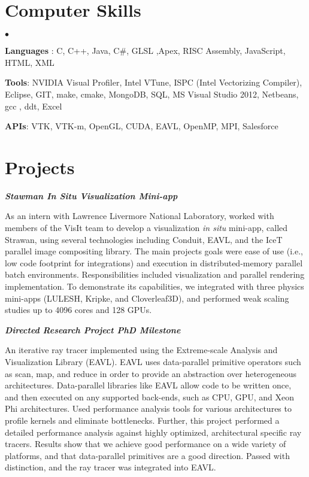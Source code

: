 \documentclass[margin,line]{res}
\newenvironment{list2}{
  \begin{list}{$\bullet$}{%
      \setlength{\itemsep}{0in}
      \setlength{\parsep}{0in} \setlength{\parskip}{0in}
      \setlength{\topsep}{0in} \setlength{\partopsep}{0in} 
      \setlength{\leftmargin}{0.2in}}}{\end{list}}
\begin{document}
\begin{resume}
\section{\sc Computer Skills} 
\begin{list2}
	\item \textbf{Languages} :  C, C++, Java, C\#, GLSL ,Apex, RISC Assembly, JavaScript, HTML, XML
	\item \textbf{Tools}:  NVIDIA Visual Profiler, Intel VTune, ISPC (Intel Vectorizing Compiler), Eclipse, GIT, make, cmake, MongoDB, SQL, MS Visual Studio 2012, Netbeans, gcc , ddt, Excel 
	\item \textbf{APIs}: VTK, VTK-m, OpenGL, CUDA, EAVL, OpenMP, MPI, Salesforce
\end{list2}

\section{\sc Projects}
{\em \textbf{Stawman In Situ Visualization Mini-app} }

\vspace{-.4cm}
As an intern with Lawrence Livermore National Laboratory, worked with members of the VisIt team to develop a visualization \textit{in situ} mini-app, called Strawan, using several technologies including Conduit, EAVL, and the IceT parallel image compositing library. The main projects goals were ease of use (i.e., low code footprint for integrations) and execution in distributed-memory parallel batch environments. Responsibilities included visualization and parallel rendering implementation. To demonstrate its capabilities, we integrated with three physics mini-apps (LULESH, Kripke, and Cloverleaf3D), and performed weak scaling studies up to 4096 cores and 128 GPUs. 

{\em \textbf{Directed Research Project PhD Milestone } }

\vspace{-.4cm}
An iterative ray tracer implemented using the Extreme-scale Analysis and Visualization Library (EAVL). EAVL uses data-parallel primitive operators such as scan, map, and reduce in order to provide an abstraction over heterogeneous architectures. Data-parallel libraries like EAVL allow code to be written once, and then executed on any supported back-ends, such as CPU, GPU, and Xeon Phi architectures. Used performance analysis tools for various architectures to profile kernels and eliminate bottlenecks. Further, this project performed a detailed performance analysis against highly optimized, architectural specific ray tracers. Results show that we achieve good performance on a wide variety of platforms, and that data-parallel primitives are a good direction. Passed with distinction, and the ray tracer was integrated into EAVL.


\end{resume}
\end{document}
